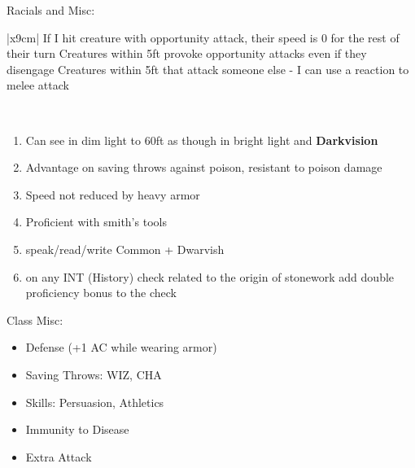 \documentclass[12pt, xcolor={dvipsnames}]{beamer}
\newcommand{\tn}{\tabularnewline\hline}
\newcommand{\wiz}{{\color{red}WIZ}}
\newcommand{\inte}{{\color{red}INT}}
\newcommand{\cha}{{\color{red}CHA}}
\begin{document}
\begin{frame}
  \tiny
  Racials and Misc:\\ \vspace{1em}

  \begin{tabular}{|x{9cm}|} \hline
    \tn
    If I hit creature with opportunity attack, their speed is 0 for the rest of their turn\tn
    Creatures within 5ft provoke opportunity attacks even if they disengage\tn
    Creatures within 5ft that attack someone else - I can use a reaction to melee attack\tn
  \end{tabular}\\ \vspace{1em}

  \begin{enumerate}
  \small

  \item Can see in dim light to 60ft as though in bright light
    and \textbf{\color{DarkOrchid}Darkvision}

  \item Advantage on saving throws against poison, resistant to poison damage

  \item Speed not reduced by heavy armor

  \item Proficient with smith's tools

  \item speak/read/write Common + Dwarvish

  \item on any {\inte} (History) check related to the origin of stonework
    add double proficiency bonus to the check
\end{enumerate}
\end{frame}

\begin{frame}
  Class Misc:
  \begin{itemize}
    \item Defense (+1 AC while wearing armor)

    \item Saving Throws:  {\wiz}, {\cha}

    \item Skills: Persuasion, Athletics

    \item Immunity to Disease

    \item Extra Attack
  \end{itemize}
\end{frame}
\end{document}
